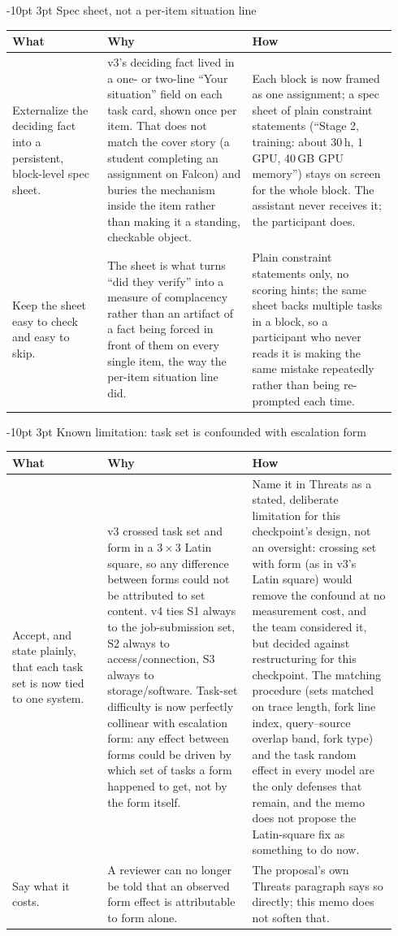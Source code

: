 \documentclass[9pt,letterpaper]{extarticle}
\makeatletter
\newcommand{\rowsep}{\noalign{\vskip 1.5pt}\arrayrulecolor{black!35}\hline\arrayrulecolor{black}\noalign{\vskip 1.5pt}}
\renewcommand\section{\@startsection{section}{1}{\z@}%
  {-10pt \@plus -2pt \@minus -1pt}{3pt}%
  {\sffamily\bfseries\large\color{accent}}}
\let\oldsection\section
\renewcommand{\section}{\needspace{7\baselineskip}\oldsection}
\newcommand{\wwh}{\toprule
\sffamily\bfseries\color{accent} What & \sffamily\bfseries\color{accent} Why & \sffamily\bfseries\color{accent} How \\
\midrule}
\newenvironment{wwhtable}{\footnotesize
\begin{longtable}{@{}>{\raggedright\arraybackslash}p{0.23\linewidth}>{\raggedright\arraybackslash}p{0.355\linewidth}>{\raggedright\arraybackslash}p{0.355\linewidth}@{}}
\wwh}{\bottomrule\end{longtable}}
\makeatother
\begin{document}
\section{Spec sheet, not a per-item situation line}
\begin{wwhtable}
Externalize the deciding fact into a persistent, block-level spec sheet. &
v3's deciding fact lived in a one- or two-line ``Your situation'' field on
each task card, shown once per item. That does not match the cover story
(a student completing an assignment on Falcon) and buries the mechanism
inside the item rather than making it a standing, checkable object. &
Each block is now framed as one assignment; a spec sheet of plain
constraint statements (``Stage 2, training: about 30\,h, 1 GPU, 40\,GB GPU
memory'') stays on screen for the whole block. The assistant never
receives it; the participant does. \\
\rowsep
Keep the sheet easy to check and easy to skip. &
The sheet is what turns ``did they verify'' into a measure of complacency
rather than an artifact of a fact being forced in front of them on every
single item, the way the per-item situation line did. &
Plain constraint statements only, no scoring hints; the same sheet backs
multiple tasks in a block, so a participant who never reads it is making
the same mistake repeatedly rather than being re-prompted each time. \\
\end{wwhtable}

\section{Known limitation: task set is confounded with escalation form}
\begin{wwhtable}
Accept, and state plainly, that each task set is now tied to one system. &
v3 crossed task set and form in a $3\times3$ Latin square, so any
difference between forms could not be attributed to set content. v4 ties
S1 always to the job-submission set, S2 always to access/connection, S3
always to storage/software. Task-set difficulty is now perfectly
collinear with escalation form: any effect between forms could be driven
by which set of tasks a form happened to get, not by the form itself. &
Name it in Threats as a stated, deliberate limitation for this
checkpoint's design, not an oversight: crossing set with form (as in v3's
Latin square) would remove the confound at no measurement cost, and the
team considered it, but decided against restructuring for this
checkpoint. The matching procedure (sets matched on trace length, fork
line index, query--source overlap band, fork type) and the task random
effect in every model are the only defenses that remain, and the memo does
not propose the Latin-square fix as something to do now. \\
\rowsep
Say what it costs. &
A reviewer can no longer be told that an observed form effect is
attributable to form alone. &
The proposal's own Threats paragraph says so directly; this memo does not
soften that. \\
\end{wwhtable}
\end{document}
